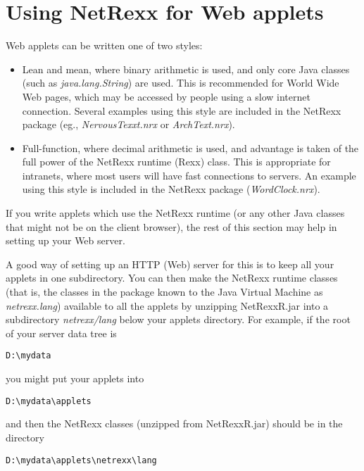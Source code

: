 \chapter{Using NetRexx for Web applets}

Web applets can be written one of two styles:
\begin{itemize}
\item Lean and mean, where binary arithmetic is used, and only core
Java classes (such as \emph{java.lang.String}) are used.  This is
recommended for World Wide Web pages, which may be accessed by people
using a slow internet connection.
Several examples using this style are included in the NetRexx package
(eg., \emph{NervousTexxt.nrx} or \emph{ArchText.nrx}).
\item Full-function, where decimal arithmetic is used, and advantage is
taken of the full power of the NetRexx runtime (Rexx) class.
This is appropriate for intranets, where most users will have fast
connections to servers.
An example using this style is included in the NetRexx package
(\emph{WordClock.nrx}).
\end{itemize}
If you write applets which use the NetRexx runtime (or any other Java
classes that might not be on the client browser), the rest of this
section may help in setting up your Web server.

A good way of setting up an HTTP (Web) server for this is to keep all
your applets in one subdirectory.  You can then make the NetRexx runtime
classes (that is, the classes in the package known to the Java Virtual
Machine as \emph{netrexx.lang}) available to all the applets by
unzipping NetRexxR.jar into a subdirectory \emph{netrexx/lang} below
your applets directory.
\newline
For example, if the root of your server data tree is
\begin{verbatim}
D:\mydata
\end{verbatim}
 you might put your applets into
\begin{verbatim}
D:\mydata\applets
\end{verbatim}
and then the NetRexx classes (unzipped from NetRexxR.jar) should be in
the directory
\begin{verbatim}
D:\mydata\applets\netrexx\lang
\end{verbatim}


